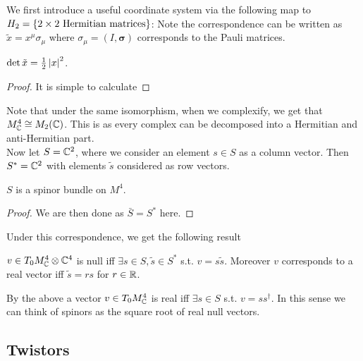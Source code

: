 \documentclass{article}
\begin{document}
We first introduce a useful coordinate system via the following map to $H_2 = \left\{ \text{$2\times 2$ Hermitian matrices} \right\}$:
Note the correspondence can be written as $\tilde{x} = x^\mu \sigma_\mu$ where $\sigma_\mu = (I,\bm{\sigma})$ corresponds to the Pauli matrices.
\begin{prop}
	$\det \tilde{x} = \frac{1}{2} \left\lvert x \right\rvert^2$. 
\end{prop}
\begin{proof}
	 It is simple to calculate 
\end{proof}
Note that under the same isomorphism, when we complexify, we get that $M_{\mathbb{C}}^4 \cong M_2(\mathbb{C})$. This is as every complex can be decomposed into a Hermitian and anti-Hermitian part. \\
Now let $S = \mathbb{C}^2$, where we consider an element $s \in S$ as a column vector. Then $S^\ast = \mathbb{C}^2$ with elements $\tilde{s}$ considered as row vectors. 
\begin{prop}
	$S$ is a spinor bundle on $M^4$. 
\end{prop} 
\begin{proof}
We are then done as $\bar{S} = S^\ast$ here. 
\end{proof}
Under this correspondence, we get the following result
\begin{lemma}
	$v \in T_0M^4_{\mathbb{C}} \otimes \mathbb{C}^4$ is null iff $\exists s\in S, \tilde{s} \in S^\ast$ s.t. $v = s \tilde{s}$. Moreover $v$ corresponds to a real vector iff $\tilde{s} = rs$ for $r \in \mathbb{R}$. 
\end{lemma}
\begin{remark}
	By the above a vector $v \in T_0M^4_{\mathbb{C}}$ is real iff $\exists s \in S$ s.t. $v = ss^\dagger$. In this sense we can think of spinors as the square root of real null vectors. 
\end{remark}
\subsection{Twistors}
\end{document}
